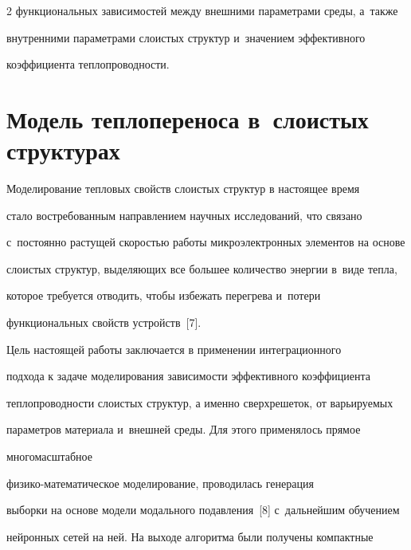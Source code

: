 \begin{multicols}{2}
функциональных зависимостей между внеш\-ни\-ми па\-ра\-мет\-ра\-ми среды, а~так\-же 


внут\-рен\-ни\-ми параметрами сло\-истых структур и~значением эффективного 


коэффициента теп\-ло\-про\-вод\-ности.





\vspace*{-6pt}





\section{Модель теплопереноса в~слоистых структурах}





\vspace*{-4pt}





    Моделирование тепловых свойств слоистых структур в настоящее время 


стало востребованным направлением научных исследований, что связано 


с~постоянно растущей скоростью работы микроэлектронных элементов на основе 


слоистых структур, выделяющих все большее количество энергии в~виде тепла, 


которое требуется отводить, \mbox{чтобы} избежать перегрева и~потери 


функциональных свойств устройств~[7].


     


    Цель настоящей работы заключается в применении интеграционного 


подхода к задаче моделирования зависимости эффективного коэффициента 


теплопроводности слоистых структур, а именно сверхрешеток, от варьируемых 


параметров материала и~внеш\-ней среды. Для этого применялось прямое 


многомасштабное 


 фи\-зи\-ко-ма\-те\-ма\-ти\-че\-ское моделирование, проводилась генерация 


выборки на основе модели модального подавления~[8] с~дальнейшим обучением 


нейронных сетей на ней. На выходе алгоритма были получены компактные 



\end{multicols}
